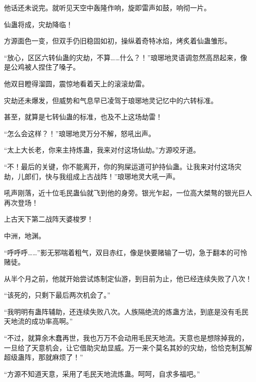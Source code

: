 \begin{this_body}
他话还未说完。就听见天空中轰隆作响，旋即雷声如鼓，响彻一片。

仙蛊将成，灾劫降临！

方源面色一变，但双手仍旧稳固如初，操纵着奇特冰焰，烤炙着仙蛊雏形。

“放心，区区六转仙蛊的灾劫，不算……什么？！”琅琊地灵语调忽然高昂起来，像是公鸡被人捏住了嗓子。

他双目瞪得溜圆，震惊地看着天上的滚滚劫雷。

灾劫还未爆发，但威势和气息早已凌驾于琅琊地灵记忆中的六转标准。

甚至，就算是七转仙蛊的标准，也及不上这场劫雷！

“怎么会这样？！”琅琊地灵万分不解，怒吼出声。

“太上大长老，你来主持炼蛊，我来对付这场仙劫。”方源咬牙道。

“不！最后的关键，你不能离开，你的狗屎运道可护持仙蛊。让我来对付这场灾劫，儿郎们，快与我组成上古战阵！”琅琊地灵大吼一声。

吼声刚落，近十位毛民蛊仙就飞到他的身旁。银光乍起，一位高大桀骜的银光巨人再次登场！

上古天下第二战阵天婆梭罗！

中洲，地渊。

“呼呼呼……”影无邪喘着粗气，双目赤红，像是快要赌输了一切，急于翻本的可怜赌徒。

从半个月之前，他就开始尝试炼制定仙游，到目前为止，他已经连续失败了八次！

“该死的，只剩下最后两次机会了。”

“我明明有蛊阵辅助，还连续失败八次。人族隔绝流的炼蛊方法，到底是没有毛民天地流的成功率高啊。”

“不过，就算余木蠢再世，我也万万不会动用毛民天地流。天意也是想除掉我的，一旦给了天意机会，让它借助灾劫显威。万一来个莫名其妙的灾劫，恰恰克制瓦解超级蛊阵，那就麻烦了！”

“方源不知道天意，采用了毛民天地流炼蛊。呵呵，自求多福吧。”

\end{this_body}

